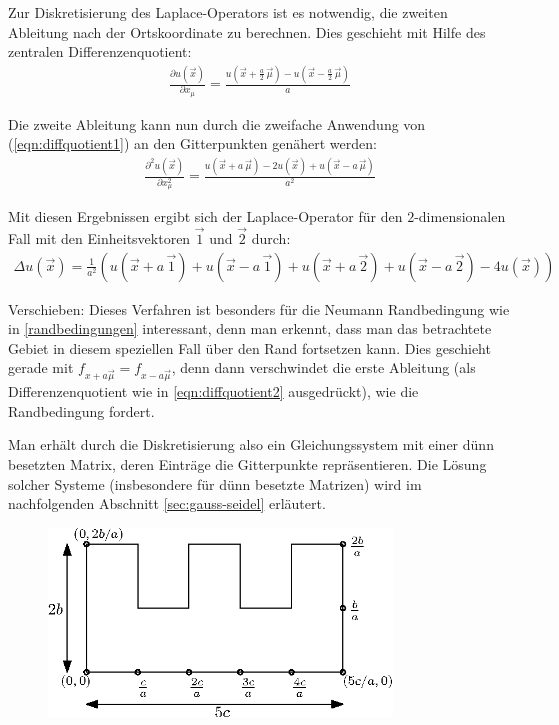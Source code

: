 \documentclass[10pt,a4paper]{article}
\begin{document}
Zur Diskretisierung des Laplace-Operators ist es notwendig, die zweiten Ableitung nach der Ortskoordinate zu berechnen. Dies geschieht mit Hilfe des zentralen Differenzenquotient:
\begin{align}
\frac{\partial u(\vec{x})}{\partial x_{\mu}}=\frac{u(\vec{x}+\frac{a}{2}\,\vec{\mu}) - u(\vec{x}-\frac{a}{2}\,\vec{\mu})}{a}
\label{eqn:diffquotient1}
\end{align}

Die zweite Ableitung kann nun durch die zweifache Anwendung von (\ref{eqn:diffquotient1}) an den Gitterpunkten genähert werden:
\begin{align}
\frac{\partial^2 u(\vec{x})}{\partial x_{\mu}^2}=\frac{u(\vec{x}+a\,\vec{\mu})-2 u(\vec{x})+u(\vec{x}-a\,\vec{\mu})}{a^2}
\label{eqn:diffquotient2}
\end{align}

Mit diesen Ergebnissen ergibt sich der Laplace-Operator für den $2$-dimensionalen Fall mit den Einheitsvektoren $\vec{1}$ und $\vec{2}$ durch:
\begin{align}
\Delta u(\vec{x})=\frac{1}{a^2}\left(u(\vec{x}+a\,\vec{1}) + u(\vec{x}-a\,\vec{1}) + u(\vec{x}+a\,\vec{2})+u(\vec{x}-a\,\vec{2}) -4 u(\vec{x})\right)
\label{eqn:diffquotient2}
\end{align}

Verschieben: Dieses Verfahren ist besonders für die Neumann Randbedingung wie in  \ref{randbedingungen} interessant, denn man erkennt, dass man das betrachtete Gebiet in diesem speziellen Fall über den Rand fortsetzen kann. Dies geschieht gerade mit $f_{x+a\vec{\mu}}=f_{x-a\vec{\mu}}$, denn dann verschwindet die erste Ableitung (als Differenzenquotient wie in \ref{eqn:diffquotient2} ausgedrückt), wie die Randbedingung fordert.

Man erhält durch die Diskretisierung also ein Gleichungssystem mit einer dünn besetzten Matrix, deren Einträge die Gitterpunkte repräsentieren. Die Lösung solcher Systeme (insbesondere für dünn besetzte Matrizen) wird im nachfolgenden Abschnitt \ref{sec:gauss-seidel} erläutert.

\begin{figure}[htbp!]
\centering
\includegraphics[height=5cm]{./figures/grid.eps}
\end{figure}
\end{document}
